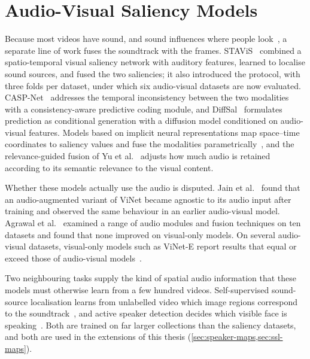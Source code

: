 \section{Audio-Visual Saliency Models}\label{sec:related-av}

Because most videos have sound, and sound influences where people
look~\cite{coutrot2012influence,coutrot2014how}, a separate line of work fuses
the soundtrack with the frames. STAViS~\cite{tsiami2020stavis} combined a
spatio-temporal visual saliency network with auditory features, learned to
localise sound sources, and fused the two saliencies; it also introduced the
protocol, with three folds per dataset, under which six audio-visual datasets
are now evaluated. CASP-Net~\cite{xiong2023casp} addresses the temporal
inconsistency between the two modalities with a consistency-aware predictive
coding module, and DiffSal~\cite{xiong2024diffsal} formulates prediction as
conditional generation with a diffusion model conditioned on audio-visual
features. Models based on implicit neural representations map space--time
coordinates to saliency values and fuse the modalities
parametrically~\cite{zhu2024discrete,zhang2025audio}, and the relevance-guided
fusion of Yu et al.~\cite{yu2026relevance} adjusts how much audio is retained
according to its semantic relevance to the visual content.

Whether these models actually use the audio is disputed. Jain et
al.~\cite{jain2021vinet} found that an audio-augmented variant of ViNet became
agnostic to its audio input after training and observed the same behaviour in
an earlier audio-visual model. Agrawal et al.~\cite{agrawal2022does} examined a
range of audio modules and fusion techniques on ten datasets and found that none
improved on visual-only models. On several audio-visual datasets, visual-only
models such as ViNet-E report results that equal or exceed those of
audio-visual models~\cite{girmaji2025minimalistic}.

Two neighbouring tasks supply the kind of spatial audio information that these
models must otherwise learn from a few hundred videos. Self-supervised
sound-source localisation learns from unlabelled video which image regions
correspond to the soundtrack~\cite{mo2022localizing}, and active speaker
detection decides which visible face is speaking~\cite{liao2023light}. Both are
trained on far larger collections than the saliency datasets, and both are used
in the extensions of this thesis (\cref{sec:speaker-maps,sec:ssl-maps}).

